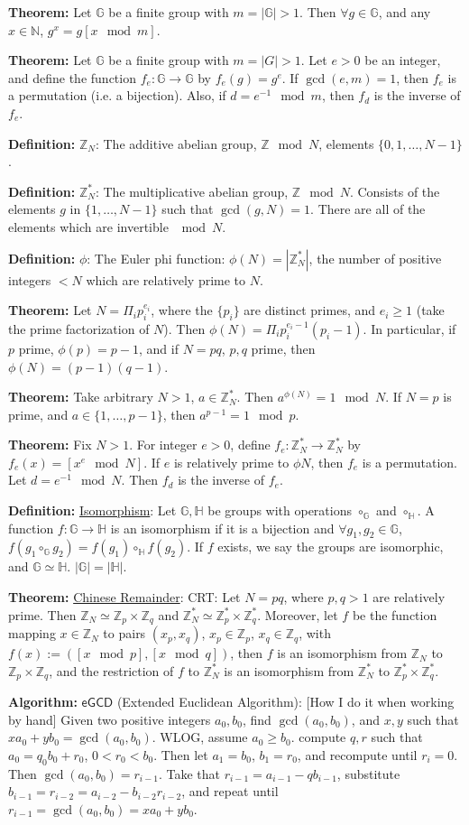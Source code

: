 \documentclass[10pt]{article}
\newcommand{\Z}{\mathbb{Z}}
\newcommand{\N}{\mathbb{N}}
\newcommand{\G}{\mathbb{G}}
\newcommand{\HH}{\mathbb{H}}
\newcommand{\defn}[1]{{\bf Definition:} \underline{#1}}
\newcommand{\thm}[1]{{\bf Theorem:} \underline{#1}}
\newcommand{\alg}[1]{{\bf Algorithm:} \underline{#1}}
\begin{document}
\begin{multicols}{4}
\thm{}Let $\G$ be a finite group with $m=|\G|>1$. Then $\forall g\in\G$, and any $x\in\N$, $g^{x}=g{[x\mod{m}]}$.

\thm{}Let $\G$ be a finite group with $m=|G|>1$. Let $e>0$ be an integer, and define the function $f_e:\G\to\G$ by $f_e(g)=g^e$. If $\gcd(e,m)=1$, then $f_e$ is a permutation (i.e. a bijection). Also, if $d=e^{-1}\mod{m}$, then $f_d$ is the inverse of $f_e$.

\defn{$\Z_N$}: The additive abelian group, $\Z\mod{N}$, elements $\{0,1,\dots,N-1\}$. 

\defn{$\Z_N^*$}: The multiplicative abelian group, $\Z\mod{N}$. Consists of the elements $g$ in $\{1,\dots,N-1\}$ such that $\gcd(g,N)=1$. There are all of the elements which are invertible $\mod{N}$.

\defn{$\phi$}: The Euler phi function: $\phi(N)=|\Z_N^*|$, the number of positive integers $<N$ which are relatively prime to $N$.

\thm{}Let $N=\Pi_ip_i^{e_i}$, where the $\{p_i\}$ are distinct primes, and $e_i\geq 1$ (take the prime factorization of $N$). Then $\phi(N)=\Pi_ip_i^{e_i-1}(p_i-1)$. In particular, if $p$ prime, $\phi(p)=p-1$, and if $N=pq$, $p,q$ prime, then $\phi(N)=(p-1)(q-1)$.

\thm{}Take arbitrary $N>1$, $a\in\Z_N^*$. Then $a^{\phi(N)}=1\mod{N}$. If $N=p$ is prime, and $a\in\{1,\dots,p-1\}$, then $a^{p-1}=1\mod{p}$.

\thm{}Fix $N>1$. For integer $e>0$, define $f_e:\Z_N^*\to\Z_N^*$ by $f_e(x)=[x^e\mod{N}]$. If $e$ is relatively prime to $\phi{N}$, then $f_e$ is a permutation. Let $d=e^{-1}\mod{N}$. Then $f_d$ is the inverse of $f_e$.

\defn{Isomorphism}: Let $\G,\HH$ be groups with operations $\circ_\G$ and $\circ_\HH$. A function $f:\G\to\HH$ is an isomorphism if it is a bijection and $\forall g_1,g_2\in\G$, $f(g_1\circ_\G g_2)=f(g_1)\circ_\HH f(g_2)$. If $f$ exists, we say the groups are isomorphic, and $\G\simeq\HH$. $|\G|=|\HH|$.

\thm{Chinese Remainder}: CRT: Let $N=pq$, where $p,q>1$ are relatively prime. Then $\Z_N\simeq\Z_p\times\Z_q$ and $\Z_N^*\simeq\Z_p^*\times\Z_q^*$. Moreover, let $f$ be the function mapping $x\in\Z_N$ to pairs $(x_p,x_q)$, $x_p\in\Z_p$, $x_q\in\Z_q$, with $f(x):=([x\mod{p}],[x\mod{q}])$, then $f$ is an isomorphism from $\Z_N$ to $\Z_p\times\Z_q$, and the restriction of $f$ to $\Z_N^*$ is an isomorphism from $\Z_N^*$ to $\Z_p^*\times\Z_q^*$.

\alg{$\mathsf{eGCD}$} (Extended Euclidean Algorithm): [How I do it when working by hand] Given two positive integers $a_0,b_0$, find $\gcd(a_0,b_0)$, and $x,y$ such that $xa_0+yb_0=\gcd(a_0,b_0)$. WLOG, assume $a_0\geq b_0$. compute $q,r$ such that $a_0=q_0b_0+r_0$, $0<r_0<b_0$. Then let $a_1=b_0$, $b_1=r_0$, and recompute until $r_i=0$. Then $\gcd(a_0,b_0)=r_{i-1}$. Take that $r_{i-1}=a_{i-1}-qb_{i-1}$, substitute $b_{i-1}=r_{i-2}=a_{i-2}-b_{i-2}r_{i-2}$, and repeat until $r_{i-1}=\gcd(a_0,b_0)=xa_0+yb_0$.


\end{multicols}
\end{document}

